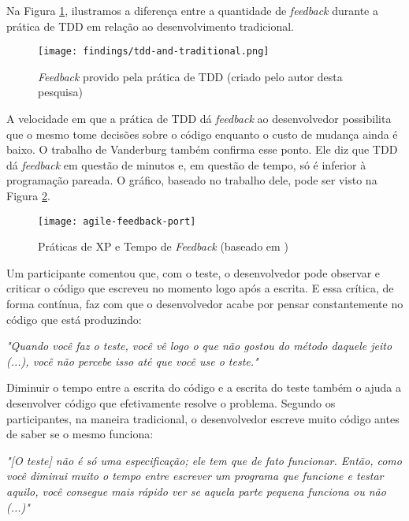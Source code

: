 Na Figura \ref{fig:tdd-feedback}, ilustramos
a diferença entre a quantidade de \textit{feedback} durante a prática de TDD em relação
ao desenvolvimento tradicional.

\begin{figure}[h!H]
  \centering
  \texttt{[image: findings/tdd-and-traditional.png]}
  \caption{\textit{Feedback} provido pela prática de TDD (criado pelo autor
  desta pesquisa)}
  \label{fig:tdd-feedback}
\end{figure}

A velocidade em que a prática de TDD dá \textit{feedback} ao desenvolvedor possibilita que o mesmo
tome decisões sobre o código enquanto o custo de mudança ainda é
baixo. O trabalho de Vanderburg \cite{vanderburg} também confirma esse ponto.
Ele diz que TDD dá \textit{feedback} em questão de
minutos e, em questão de tempo, só é inferior à programação pareada. O gráfico,
baseado no trabalho dele, pode ser visto na Figura
\ref{fig:agile-feedback}.

\begin{figure}[h!H]
  \centering
  \texttt{[image: agile-feedback-port]}
  \caption{Práticas de XP e Tempo de \textit{Feedback} (baseado em \cite{vanderburg})}
  \label{fig:agile-feedback}
\end{figure}

Um participante comentou que, com o teste, o desenvolvedor pode observar
e criticar o código que escreveu no momento logo após a escrita.
E essa crítica, de forma contínua, faz com que o desenvolvedor acabe
por pensar constantemente no código que está produzindo:

\begin{framed}
\textit{"Quando você faz o teste, você vê logo o que não gostou do método daquele jeito (...), você
não percebe isso até que você use o teste."}
\end{framed}

Diminuir o tempo entre a escrita do código e a escrita do teste também o ajuda a desenvolver código
que efetivamente resolve o problema. Segundo os participantes, na maneira tradicional, 
o desenvolvedor escreve muito código antes de saber se o mesmo funciona:

\begin{framed}
\textit{"[O teste] não é só uma especificação; ele tem que de fato funcionar. Então,
como você diminui muito o tempo entre escrever um programa que funcione e testar aquilo,
você consegue mais rápido ver se aquela parte pequena funciona ou não (...)"}
\end{framed}


